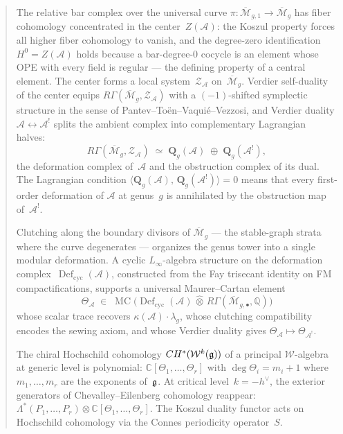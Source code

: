 \documentclass[11pt]{memoir}
\newcommand{\cA}{\mathcal{A}}
\newcommand{\ChirHoch}{CH}                      %
\newcommand{\Defcyc}{\operatorname{Def}_{\mathrm{cyc}}}  %
\begin{document}
\begin{abstract}
\medskip
The relative bar complex over the universal curve
$\pi\colon \overline{\mathcal{M}}_{g,1} \to \overline{\mathcal{M}}_g$
has fiber cohomology concentrated in the center~$Z(\cA)$: the
Koszul property forces all higher fiber cohomology to vanish, and
the degree-zero identification $H^0 = Z(\cA)$ holds because a
bar-degree-$0$ cocycle is an element whose OPE with every field is
regular --- the defining property of a central element.  The center
forms a local system~$\mathcal{Z}_\cA$ on~$\overline{\mathcal{M}}_g$.
Verdier self-duality of the center equips
$R\Gamma(\overline{\mathcal{M}}_g, \mathcal{Z}_\cA)$ with a
$(-1)$-shifted symplectic structure in the sense of
Pantev--To\"en--Vaqui\'e--Vezzosi, and Verdier duality
$\cA \leftrightarrow \cA^!$ splits the ambient complex into
complementary Lagrangian halves:
\[
R\Gamma(\overline{\mathcal{M}}_g, \mathcal{Z}_\cA)
\;\simeq\;
\mathbf{Q}_g(\cA) \;\oplus\; \mathbf{Q}_g(\cA^!),
\]
the deformation complex of~$\cA$ and the obstruction complex of its
dual.  The Lagrangian condition
$\langle \mathbf{Q}_g(\cA),\, \mathbf{Q}_g(\cA^!) \rangle = 0$
means that every first-order deformation of $\cA$ at genus~$g$ is
annihilated by the obstruction map of~$\cA^!$.

Clutching along the boundary divisors of
$\overline{\mathcal{M}}_g$ --- the stable-graph strata where the
curve degenerates --- organizes the genus tower into a single modular
deformation.  A cyclic $L_\infty$-algebra structure on the deformation
complex~$\Defcyc(\cA)$, constructed from the Fay trisecant identity
on FM compactifications, supports a universal Maurer--Cartan element
\[
\Theta_\cA \;\in\;
\operatorname{MC}\bigl(
\Defcyc(\cA) \,\widehat{\otimes}\,
R\Gamma(\overline{\mathcal{M}}_{g,\bullet}, \mathbb{Q})\bigr)
\]
whose scalar trace recovers $\kappa(\cA) \cdot \lambda_g$, whose
clutching compatibility encodes the sewing axiom, and whose Verdier
duality gives $\Theta_\cA \mapsto \Theta_{\cA^!}$.

\medskip
The chiral Hochschild cohomology
$\ChirHoch^*(\mathcal{W}^k(\fg))$ of a principal $\mathcal{W}$-algebra
at generic level is polynomial:
$\mathbb{C}[\Theta_1, \ldots, \Theta_r]$
with $\deg \Theta_i = m_i + 1$ where $m_1, \ldots, m_r$ are the
exponents of~$\fg$.  At critical level~$k = -h^\vee$, the exterior
generators of Chevalley--Eilenberg cohomology reappear:
$\Lambda^*(P_1, \ldots, P_r) \otimes \mathbb{C}[\Theta_1, \ldots,
\Theta_r]$.  The Koszul duality functor acts on Hochschild cohomology
via the Connes periodicity operator~$S$.


\end{abstract}
\end{document}
